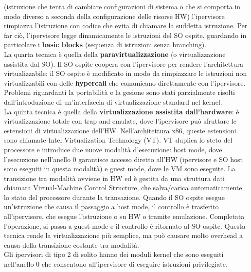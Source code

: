 \documentclass[12pt]{article}
\begin{document}
(istruzione che tenta di cambiare configurazioni di sistema o che si comporta in modo diverso a seconda della
configurazione delle risorse HW) l'ipervisore rimpiazza l'istruzione con codice che evita di chiamare la suddetta
istruzione. Per far ciò, l'ipervisore legge dinamicamente le istruzioni del SO ospite, guardando in particolare i
\textbf{basic blocks} (sequenza di istruzioni senza branching).\\
La quarta tecnica è quella della \textbf{paravirtualizzazione} (o virtualizzazione assistita dal SO). Il SO ospite
coopera con l'ipervisore per rendere l'architettura virtualizzabile: il SO ospite è modificato in modo da rimpiazzare
le istruzioni non virtualizzabili con delle \textbf{hypercall} che comunicano direttamente con l'ipervisore. 
Problemi riguardanti la portabilità e la gesione sono stati parzialmente risolti dall'introduzione di un'interfaccia di
virtualizzazione standard nel kernel.\\
La quinta tecnica è quella della \textbf{virtualizzazione assistita dall'hardware}: è virtualizzazione totale con trap
and emulate, dove l'ipervisore può sfruttare le estensioni di virtualizzazione dell'HW. Nell'architettura x86, queste
estensioni sono chiamate Intel Virtualization Technology (VT). VT duplica lo steto del processore e introduce due nuove
modalità d'esecuzione: host mode, dove l'esecuzione nell'anello 0 garantisce accesso diretto all'HW (ipervisore e SO
host sono eseguiti in questa modalità) e guest mode, dove le VM sono eseguite.
La transizione tra modalità avviene in HW ed è gestita da una struttura dati chiamata Virtual-Machine Control Structure,
che salva/carica automaticamente lo stato del processore durante la transazione. Quando il SO ospite esegue un'istruzione
che causa il passaggio a host mode, il controllo è trasferito all'ipervisore, che esegue l'istruzione o su HW o tramite
emulazione. Completata l'operazione, si passa a guest mode e il controllo è ritornato al SO ospite.
Questa tecnica rende la virtualizzazione più semplice, ma può causare molto overhead a causa della transizione costante
tra modalità.\\
Gli ipervisori di tipo 2 di solito hanno dei moduli kernel che sono eseguiti nell'anello 0 che consentono all'ipervisore
di eseguire istruzioni privilegiate.
\end{document}
